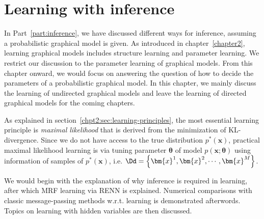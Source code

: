 \chapter{Learning with inference}
\label{chpt5:undirecteLearning}
In Part~\ref{part:inference}, we have discussed different ways for inference, assuming a probabilistic graphical model is given. As introduced in chapter~\ref{chapter2}, learning graphical models includes structure learning and parameter learning. We restrict our discussion to the parameter learning of graphical models. From this chapter onward, we would focus on answering the question of how to decide the parameters of a probabilistic graphical model.
In this chapter, we mainly discuss the learning of undirected graphical models and leave the learning of directed graphical models for the coming chapters.

As explained in section~\ref{chpt2:sec:learning-principles}, the most essential learning principle is \textit{maximal likelihood} that is derived from the minimization of KL-divergence. Since we do not have access to the true distribution $p^{\ast}(\bm{x})$, practical maximal likelihood learning is via tuning parameter $\bm{\theta}$ of model $p(\bm{x};\bm{\theta})$ using information of samples of $p^{\ast}(\bm{x})$, i.e. $\Dd = \left\{ \bm{x}^1, \bm{x}^2, \cdots, \bm{x}^{M}\right\}$.

We would begin with the explanation of why inference is required in learning, after which MRF learning via RENN is explained. Numerical comparisons with classic message-passing methods w.r.t. learning is demonstrated afterwords. Topics on learning with hidden variables are then discussed.

